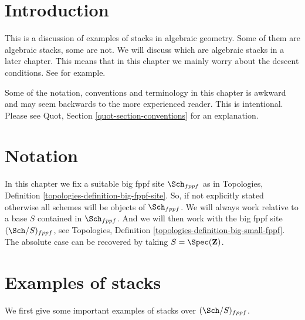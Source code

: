 \section{Introduction}
\label{examples-stacks-section-introduction}
This is a discussion of examples of stacks in algebraic geometry.
Some of them are algebraic stacks, some are not.
We will discuss which are algebraic stacks in a later chapter.
This means that in this chapter we mainly worry about the descent
conditions. See \cite{Vis2} for example.

\medskip\noindent
Some of the notation, conventions and terminology in this chapter is awkward
and may seem backwards to the more experienced reader. This is intentional.
Please see Quot, Section \ref{quot-section-conventions} for an
explanation.

\section{Notation}
\label{examples-stacks-section-notation}
In this chapter we fix a suitable big fppf site $\Sch_{fppf}$
as in Topologies, Definition \ref{topologies-definition-big-fppf-site}.
So, if not explicitly stated otherwise all schemes will be objects
of $\Sch_{fppf}$.
We will always work relative to a base $S$ contained in $\Sch_{fppf}$.
And we will then work with the big fppf site $(\Sch/S)_{fppf}$,
see Topologies, Definition \ref{topologies-definition-big-small-fppf}.
The absolute case can be recovered by taking
$S = \Spec(\mathbf{Z})$.

\section{Examples of stacks}
\label{examples-stacks-section-examples-stacks}
We first give some important examples of stacks over
$(\Sch/S)_{fppf}$.

